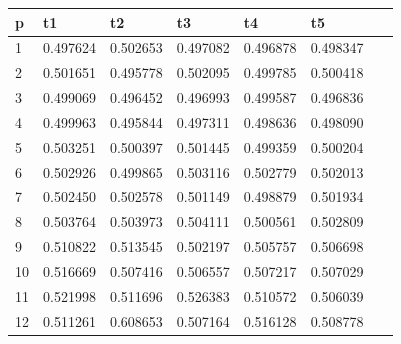 \documentclass[a4paper,11pt, twoside]{report}
\begin{document}
\begin{table}[!ht]
    \centering
    \begin{tabular}{|l|l|l|l|l|l|l|}
    \hline
        p & t1 & t2 & t3 & t4 & t5 & ~ \\ \hline
        1 & 0.497624 & 0.502653 & 0.497082 & 0.496878 & 0.498347 & ~ \\ \hline
        2 & 0.501651 & 0.495778 & 0.502095 & 0.499785 & 0.500418 & ~ \\ \hline
        3 & 0.499069 & 0.496452 & 0.496993 & 0.499587 & 0.496836 & ~ \\ \hline
        4 & 0.499963 & 0.495844 & 0.497311 & 0.498636 & 0.498090 & ~ \\ \hline
        5 & 0.503251 & 0.500397 & 0.501445 & 0.499359 & 0.500204 & ~ \\ \hline
        6 & 0.502926 & 0.499865 & 0.503116 & 0.502779 & 0.502013 & ~ \\ \hline
        7 & 0.502450 & 0.502578 & 0.501149 & 0.498879 & 0.501934 & ~ \\ \hline
        8 & 0.503764 & 0.503973 & 0.504111 & 0.500561 & 0.502809 & ~ \\ \hline
        9 & 0.510822 & 0.513545 & 0.502197 & 0.505757 & 0.506698 & ~ \\ \hline
        10 & 0.516669 & 0.507416 & 0.506557 & 0.507217 & 0.507029 & ~ \\ \hline
        11 & 0.521998 & 0.511696 & 0.526383 & 0.510572 & 0.506039 & ~ \\ \hline
        12 & 0.511261 & 0.608653 & 0.507164 & 0.516128 & 0.508778 & ~ \\ \hline
    \end{tabular}
\end{table}
\end{document}
